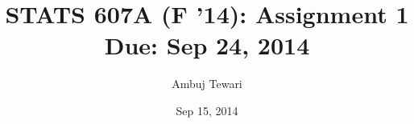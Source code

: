 \usepackage{fullpage}
\usepackage{amsmath,amssymb,amsthm}

\author{Ambuj Tewari}
\title{STATS 607A (F '14): Assignment 1\\
Due: Sep 24, 2014}
\date{Sep 15, 2014}
